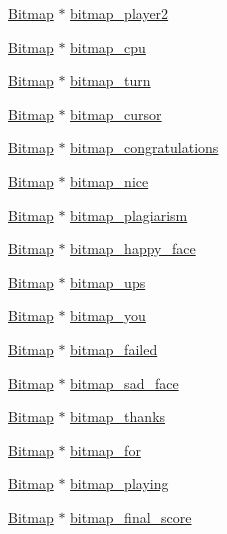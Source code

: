 \begin{DoxyCompactItemize}
\item 
\hyperlink{struct_bitmap}{Bitmap} $\ast$ \hyperlink{group___bitmap_ga63e9b3ca144cce02448900ffe9add6c4}{bitmap\+\_\+player2}
\item 
\hyperlink{struct_bitmap}{Bitmap} $\ast$ \hyperlink{group___bitmap_ga4eb982d201096abdac3cacd3f6459ff2}{bitmap\+\_\+cpu}
\item 
\hyperlink{struct_bitmap}{Bitmap} $\ast$ \hyperlink{group___bitmap_ga6fa1dd9e73670e1d22f5b6d258eb0e77}{bitmap\+\_\+turn}
\item 
\hyperlink{struct_bitmap}{Bitmap} $\ast$ \hyperlink{group___bitmap_gae897f24816ba9a98f564b2b7ff488bc2}{bitmap\+\_\+cursor}
\item 
\hyperlink{struct_bitmap}{Bitmap} $\ast$ \hyperlink{group___bitmap_ga1f04a1ac0e8402f5de2230baf1f6818d}{bitmap\+\_\+congratulations}
\item 
\hyperlink{struct_bitmap}{Bitmap} $\ast$ \hyperlink{group___bitmap_gaf4ba721599394ebe28ce58f495fa1226}{bitmap\+\_\+nice}
\item 
\hyperlink{struct_bitmap}{Bitmap} $\ast$ \hyperlink{group___bitmap_ga68d193359f4b1253056be87ab752f5f0}{bitmap\+\_\+plagiarism}
\item 
\hyperlink{struct_bitmap}{Bitmap} $\ast$ \hyperlink{group___bitmap_ga47000f83189d2a2f74f1148050ee338b}{bitmap\+\_\+happy\+\_\+face}
\item 
\hyperlink{struct_bitmap}{Bitmap} $\ast$ \hyperlink{group___bitmap_gaaedffcc0ad02fe92aaae449a289619e3}{bitmap\+\_\+ups}
\item 
\hyperlink{struct_bitmap}{Bitmap} $\ast$ \hyperlink{group___bitmap_gacc8a2c20312c8ec30b84297cbf6df6f2}{bitmap\+\_\+you}
\item 
\hyperlink{struct_bitmap}{Bitmap} $\ast$ \hyperlink{group___bitmap_ga5d96b14aaf8cbac173f6d809be1ff7d4}{bitmap\+\_\+failed}
\item 
\hyperlink{struct_bitmap}{Bitmap} $\ast$ \hyperlink{group___bitmap_ga712c5447dd57d83342185a9ac9ca7015}{bitmap\+\_\+sad\+\_\+face}
\item 
\hyperlink{struct_bitmap}{Bitmap} $\ast$ \hyperlink{group___bitmap_ga227e788aa82989593af33621bfb230bd}{bitmap\+\_\+thanks}
\item 
\hyperlink{struct_bitmap}{Bitmap} $\ast$ \hyperlink{group___bitmap_ga04b3490379f60798e7a6de171979a90f}{bitmap\+\_\+for}
\item 
\hyperlink{struct_bitmap}{Bitmap} $\ast$ \hyperlink{group___bitmap_ga57060e5b51d9603d9fc393526c965a3b}{bitmap\+\_\+playing}
\item 
\hyperlink{struct_bitmap}{Bitmap} $\ast$ \hyperlink{group___bitmap_gacb59d00d1a96d8b830bddde99bc4f7dd}{bitmap\+\_\+final\+\_\+score}
\end{DoxyCompactItemize}


